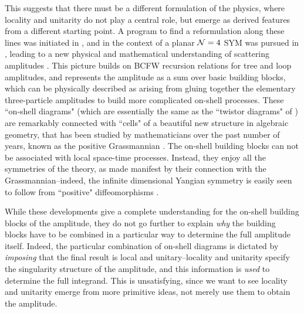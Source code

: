 \documentclass[12pt,nohyper,twosided]{JHEP3}
\begin{document}
This suggests that there must be a different formulation of the
physics, where locality and unitarity do not play a central role,
but emerge as derived features from a different starting point. A
program to find a reformulation along these lines was initiated in
\cite{N1,N2}, and  in the context of a planar ${\cal N} = 4$ SYM was
pursued in \cite{N3,N4,N5}, leading to a new physical and
mathematical understanding of scattering amplitudes \cite{N6}. This
picture builds on BCFW recursion relations for tree \cite{BCFW1,
BCFW2} and loop \cite{N5,Rutger} amplitudes, and represents the
amplitude as a sum over basic building blocks, which can be
physically described as arising from gluing together the elementary
three-particle amplitudes to build more complicated on-shell
processes. These ``on-shell diagrams" (which are essentially the
same as the ``twistor diagrams" of \cite{TD1,TD2,N3}) are remarkably
connected with ``cells" of a beautiful new structure in algebraic
geometry, that has been studied by mathematicians over the past
number of years, known as the positive Grassmannian \cite{alex, N6}.
The on-shell building blocks can not be associated with  local
space-time processes. Instead, they enjoy all the symmetries of the
theory, as made manifest by their connection with the
Grassmannian--indeed, the infinite dimensional Yangian symmetry is
easily seen to follow from ``positive" diffeomorphisms \cite{N6}.

While these developments give a complete understanding for the
on-shell building blocks of the amplitude, they do not go further to
explain {\it why} the building blocks have to be combined in a
particular way to determine the full amplitude itself. Indeed, the
particular combination of on-shell diagrams is dictated by {\it
imposing} that the final result is local and unitary--locality and
unitarity specify the singularity structure of the amplitude, and
this information is {\it used} to determine the full integrand. This
is unsatisfying, since we want to see locality and unitarity emerge
from more primitive ideas, not merely use them to obtain the
amplitude.
\end{document}
